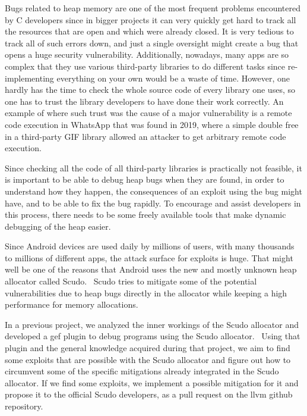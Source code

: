 \documentclass[a4paper,11pt,oneside]{report}
\begin{document}
Bugs related to heap memory are one of the most frequent problems encountered
by C developers since in bigger projects it can very quickly get hard to track
all the resources that are open and which were already closed. It is very tedious
to track all of such errors down, and just a single oversight might create a bug
that opens a huge security vulnerability. Additionally, nowadays, many apps are so
complex that they use various third-party libraries to do different tasks since
re-implementing everything on your own would be a waste of time. However, one
hardly has the time to check the whole source code of every library one uses, so
one has to trust the library developers to have done their work correctly. An
example of where such trust was the cause of a major vulnerability is a remote
code execution in WhatsApp that was found in 2019, where a simple double free
in a third-party GIF library allowed an attacker to get arbitrary remote code
execution.~\cite{whatsappRCE}

Since checking all the code of all third-party libraries is practically not
feasible, it is important to be able to debug heap bugs when they are found, in
order to understand how they happen, the consequences of an exploit using the
bug might have, and to be able to fix the bug rapidly. To encourage
and assist developers in this process, there needs to be some freely available
tools that make dynamic debugging of the heap easier.

Since Android devices are used daily by millions of users, with many thousands to
millions of different apps, the attack surface for exploits is huge. That might
well be one of the reasons that Android uses the new and mostly unknown heap
allocator called Scudo.~\cite{llvmScudo} Scudo tries to mitigate some of the potential
vulnerabilities due to heap bugs directly in the allocator while keeping a high
performance for memory allocations.

In a previous project, we analyzed the inner workings of the Scudo allocator and developed
a gef plugin to debug programs using the Scudo allocator.~\cite{scudoTooling} Using that
plugin and the general knowledge acquired during that project, we aim to find some
exploits that are possible with the Scudo allocator and figure out how to circumvent some
of the specific mitigations already integrated in the Scudo allocator. If we find some
exploits, we implement a possible mitigation for it and propose it to the official Scudo
developers, as a pull request on the llvm github repository.
\end{document}
